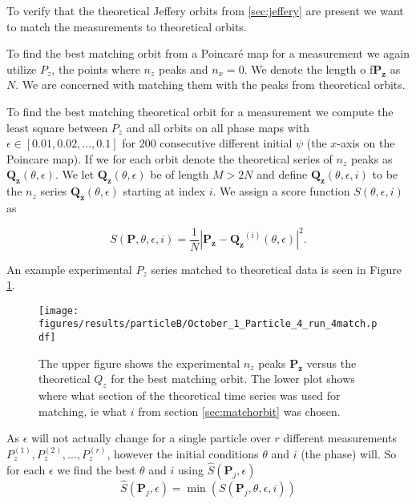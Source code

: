 \label{sec:matchorbit}
To verify that the theoretical Jeffery orbits from \ref{sec:jeffery} are present we want to match the measurements to theoretical orbits.

To find the best matching orbit from a Poincaré map for a measurement we again utilize $P_z$, the points where $n_z$ peaks and $n_x=0$. We denote the length o f$\mathbf{P_z}$ as $N$. We are concerned with matching them with the peaks from theoretical orbits.


To find the best matching theoretical orbit for a measurement we compute the least square between $P_z$ and all orbits on all phase maps with $\epsilon \in [0.01, 0.02, ..., 0.1]$ for 200 consecutive different initial $\psi$ (the $x$-axis on the Poincare map). If we for each orbit denote the theoretical series of $n_z$ peaks as $\mathbf{Q_z}(\theta, \epsilon)$. We let $\mathbf{Q_z}(\theta, \epsilon)$ be of length $M > 2N$ and define $\mathbf{Q_z}(\theta, \epsilon, i)$ to be the $n_z$ series $\mathbf{Q_z}(\theta, \epsilon)$ starting at index $i$. We assign a score function $S(\theta, \epsilon, i)$ as

\begin{equation}
S(\mathbf{P}, \theta, \epsilon, i) = \frac{1}{N}\left| \mathbf{P_z} - \mathbf{Q_z}^{(i)}(\theta, \epsilon) \right|^2.
\end{equation}

\noindent An example experimental $P_z$ series matched to theoretical data is seen in Figure \ref{fig:particleB2match}.

\begin{figure}[H]
\centering
\texttt{[image: figures/results/particleB/October\_1\_Particle\_4\_run\_4match.pdf]}
\caption{The upper figure shows the experimental $n_z$ peaks $\mathbf{P_z}$ versus the theoretical $Q_z$ for the best matching orbit. The lower plot shows where what section of the theoretical time series was used for matching, ie what $i$ from section \ref{sec:matchorbit} was chosen.}
\label{fig:particleB2match}
\end{figure}



\noindent As $\epsilon$ will not actually change for a single particle over $r$ different measurements $P_z^{(1)}, P_z^{(2)}, ..., P_z^{(r)}$, however the initial conditions $\theta$ and $i$ (the phase) will. So for each $\epsilon$ we find the best $\theta$ and $i$ using $\hat{S}(\mathbf{P}_j, \epsilon)$ 
\begin{equation}
\hat{S}(\mathbf{P}_j, \epsilon) =  \min(S(\mathbf{P}_j, \theta, \epsilon, i))
\end{equation}

